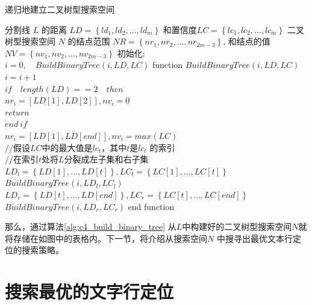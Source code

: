     \begin{algorithm}
	\renewcommand{\algorithmicrequire}{\textbf{输入:}}
	\renewcommand{\algorithmicensure}{\textbf{输出:}}
	\caption{递归地建立二叉树型搜索空间}
	\label{alg:c4_build_binary_tree}
	\begin{algorithmic}[1]
		\REQUIRE 分割线 $L$ 的距离 $LD=\left\{ld_1,ld_2,...,ld_m\right\}$ 和置信度$LC=\left\{lc_1,lc_2,...,lc_m\right\}$
		\ENSURE 二叉树型搜索空间 $N$ 的结点范围 $NR=\left\{nr_1,nr_2,...,nr_{2m-3}\right\}$, 和结点的值 $NV=\left\{nv_1,nv_2,...,nv_{2m-3}\right\}$
      \STATE 初始化: \\
      \STATE \quad $i=0, \quad BuildBinaryTree(i,LD,LC)$
      \STATE function $BuildBinaryTree(i,LD,LC)$
        \\\STATE \quad $i=i+1$
        \\\STATE \quad $if \quad length(LD)==2 \quad then$
        \\\STATE \qquad $nr_{i}=[LD[1],LD[2]], nv_{i}=0$
        \\\STATE \qquad $return$
        \\\STATE \quad $end \ if$
        \\\STATE \quad $nr_{i}=[LD[1],LD[end]], nv_{i}=max(LC)$
        \\\STATE \quad $//$假设$LC$中的最大值是$lc_t$，其中$t$是$lc_t$ 的索引
        \\\STATE \quad $//$在索引$t$处将$L$分裂成左子集和右子集
        \\\STATE \quad $LD_{l}=\left\{LD[1],...,LD[t]\right\}, LC_{l}=\left\{LC[1],...,LC[t]\right\}$
        \\\STATE \quad $BuildBinaryTree(i,LD_{l},LC_{l})$
        \\\STATE \quad $LD_{r}=\left\{LD[t],...,LD[end]\right\}, LC_{r}=\left\{LC[t],...,LC[end]\right\}$
        \\\STATE \quad $BuildBinaryTree(i,LD_{r},LC_{r})$
      \STATE end function
	\end{algorithmic}
    \end{algorithm}

    那么，通过算法\ref{alg:c4_build_binary_tree} 从$L$中构建好的二叉树型搜索空间$N$就将存储在如图中的表格内。下一节，将介绍从搜索空间$N$ 中搜寻出最优文本行定位的搜索策略。

    \section{搜索最优的文字行定位}

